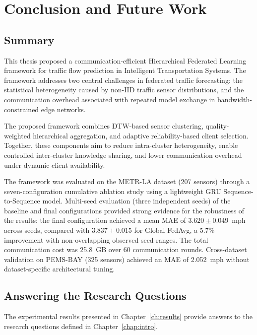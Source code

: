 \chapter{Conclusion and Future Work}
\label{ch:conclusion}

\section{Summary}

This thesis proposed a communication-efficient Hierarchical Federated Learning framework for traffic flow prediction in Intelligent Transportation Systems. The framework addresses two central challenges in federated traffic forecasting: the statistical heterogeneity caused by non-IID traffic sensor distributions, and the communication overhead associated with repeated model exchange in bandwidth-constrained edge networks.

The proposed framework combines DTW-based sensor clustering, quality-weighted hierarchical aggregation, and adaptive reliability-based client selection. Together, these components aim to reduce intra-cluster heterogeneity, enable controlled inter-cluster knowledge sharing, and lower communication overhead under dynamic client availability.

The framework was evaluated on the METR-LA dataset (207 sensors) through a seven-configuration cumulative ablation study using a lightweight GRU Sequence-to-Sequence model. Multi-seed evaluation (three independent seeds) of the baseline and final configurations provided strong evidence for the robustness of the results: the final configuration achieved a mean MAE of $3.620 \pm 0.049$~mph across seeds, compared with $3.837 \pm 0.015$ for Global FedAvg, a 5.7\% improvement with non-overlapping observed seed ranges. The total communication cost was 25.8~GB over 60 communication rounds. Cross-dataset validation on PEMS-BAY (325 sensors) achieved an MAE of 2.052~mph without dataset-specific architectural tuning.

\section{Answering the Research Questions}

The experimental results presented in Chapter~\ref{ch:results} provide answers to the research questions defined in Chapter~\ref{chap:intro}.

